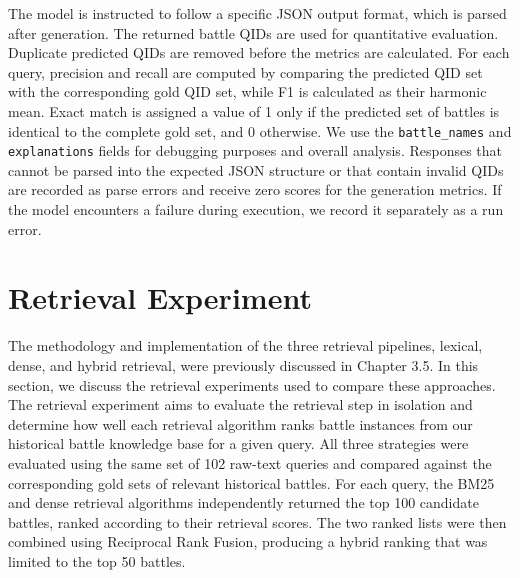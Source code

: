 The model is instructed to follow a specific JSON output format, which is parsed after generation. The returned battle QIDs are used for quantitative evaluation. Duplicate predicted QIDs are removed before the metrics are calculated. For each query, precision and recall are computed by comparing the predicted QID set with the corresponding gold QID set, while F1 is calculated as their harmonic mean. Exact match is assigned a value of 1 only if the predicted set of battles is identical to the complete gold set, and 0 otherwise. We use the \texttt{battle\_names} and \texttt{explanations} fields for debugging purposes and overall analysis. Responses that cannot be parsed into the expected JSON structure or that contain invalid QIDs are recorded as parse errors and receive zero scores for the generation metrics. If the model encounters a failure during execution, we record it separately as a run error.
\section{Retrieval Experiment}
The methodology and implementation of the three retrieval pipelines, lexical, dense, and hybrid retrieval, were previously discussed in Chapter 3.5. In this section, we discuss the retrieval experiments used to compare these approaches. The retrieval experiment aims to evaluate the retrieval step in isolation and determine how well each retrieval algorithm ranks battle instances from our historical battle knowledge base for a given query. All three strategies were evaluated using the same set of 102 raw-text queries and compared against the corresponding gold sets of relevant historical battles. For each query, the BM25 and dense retrieval algorithms independently returned the top 100 candidate battles, ranked according to their retrieval scores. The two ranked lists were then combined using Reciprocal Rank Fusion, producing a hybrid ranking that was limited to the top 50 battles.

